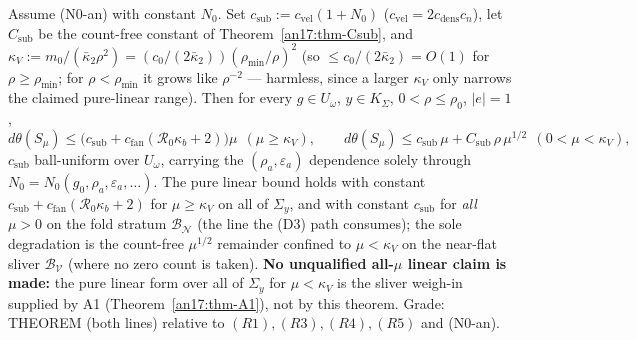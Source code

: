 \begin{theorem}
\label{an17:thm-linear}%
\label{an17:cor-split}%
\label{cor:an-split}%
Assume {\rm(N0-an)} with constant $N_0$. Set $c_{\mathrm{sub}}:=c_{\mathrm{vel}}
(1+N_0)$ ($c_{\mathrm{vel}}=2c_{\mathrm{dens}}c_n$), let $C_{\mathrm{sub}}$ be the
count-free constant of Theorem~\ref{an17:thm-Csub}, and $\kappa_V:=m_0/(\bar
\kappa_2\rho^2)=(c_0/(2\bar\kappa_2))(\rho_{\min}/\rho)^2$ (so $\le c_0/(2\bar
\kappa_2)=O(1)$ for $\rho\ge\rho_{\min}$; for $\rho<\rho_{\min}$ it grows like
$\rho^{-2}$ --- harmless, since a larger $\kappa_V$ only narrows the claimed
pure-linear range). Then for every $g\in U_\omega$,
$y\in K_\Sigma$, $0<\rho\le\rho_0$, $|e|=1$,
\begin{equation}\label{eq:an17-linear}
 d\theta(S_\mu)\le\bigl(c_{\mathrm{sub}}+c_{\mathrm{fan}}(\mathcal R_0\kappa_b
 +2)\bigr)\mu\ \ (\mu\ge\kappa_V),\qquad
 d\theta(S_\mu)\le c_{\mathrm{sub}}\,\mu+C_{\mathrm{sub}}\,\rho\,\mu^{1/2}\ \
 (0<\mu<\kappa_V),
\end{equation}
$c_{\mathrm{sub}}$ ball-uniform over $U_\omega$, carrying the
$(\rho_a,\varepsilon_a)$ dependence solely through $N_0=N_0(g_0,\rho_a,
\varepsilon_a,\dots)$. The pure linear bound holds with constant
$c_{\mathrm{sub}}+c_{\mathrm{fan}}(\mathcal R_0\kappa_b+2)$ for $\mu\ge\kappa_V$
on all of $\Sigma_y$, and with constant $c_{\mathrm{sub}}$ for \emph{all} $\mu>0$
on the fold stratum $\mathcal B_{\mathcal N}$ (the line the (D3) path consumes); the sole degradation is the count-free
$\mu^{1/2}$ remainder confined to $\mu<\kappa_V$ on the near-flat sliver
$\mathcal B_{\mathcal V}$ (where no zero count is taken). \textbf{No unqualified
all-$\mu$ linear claim is made:} the pure linear form over all of $\Sigma_y$ for
$\mu<\kappa_V$ is the sliver weigh-in supplied by A1
(Theorem~\ref{an17:thm-A1}), not by this theorem. {\rm Grade: THEOREM (both lines)
relative to $(R1),(R3),(R4),(R5)$ and (N0-an).}
\end{theorem}
